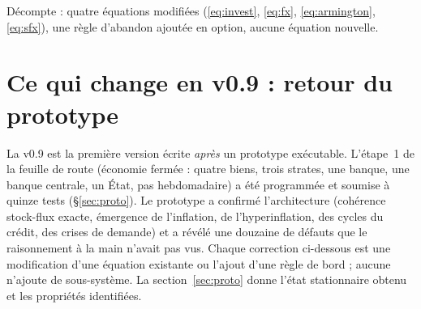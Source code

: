 \documentclass[11pt,a4paper]{article}
\begin{document}
Décompte : quatre équations modifiées (\eqref{eq:invest}, \eqref{eq:fx}, \eqref{eq:armington}, \eqref{eq:sfx}), une règle d'abandon ajoutée en option, aucune équation nouvelle.

\section*{Ce qui change en v0.9 : retour du prototype}
La v0.9 est la première version écrite \emph{après} un prototype exécutable. L'étape~1 de la feuille de route (économie fermée : quatre biens, trois strates, une banque, une banque centrale, un État, pas hebdomadaire) a été programmée et soumise à quinze tests (\S\ref{sec:proto}). Le prototype a confirmé l'architecture (cohérence stock-flux exacte, émergence de l'inflation, de l'hyperinflation, des cycles du crédit, des crises de demande) et a révélé une douzaine de défauts que le raisonnement à la main n'avait pas vus. Chaque correction ci-dessous est une modification d'une équation existante ou l'ajout d'une règle de bord ; aucune n'ajoute de sous-système. La section~\ref{sec:proto} donne l'état stationnaire obtenu et les propriétés identifiées.
\end{document}
